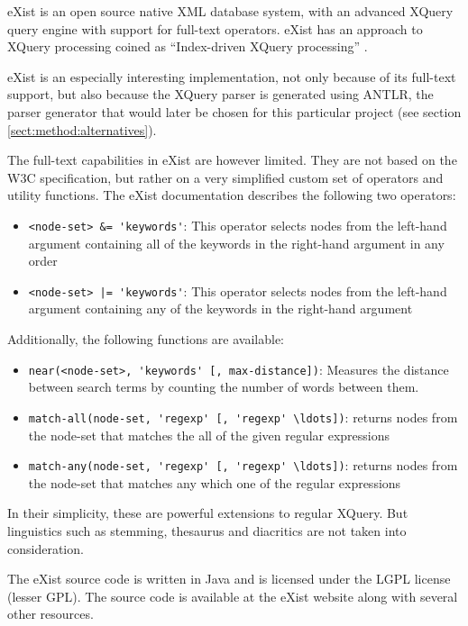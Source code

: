 eXist is an open source native XML database system, with an advanced XQuery
query engine with support for full-text operators. eXist has an approach to
XQuery processing coined as ``Index-driven XQuery processing''
\cite{exist_idx_drv_query}.

eXist is an especially interesting implementation, not only because of its
full-text support, but also because the XQuery parser is generated using
ANTLR, the parser generator that would later be chosen for this particular
project (see section \ref{sect:method:alternatives}).

The full-text capabilities in eXist are however limited. They are not based on
the W3C specification, but rather on a very simplified custom set of operators
and utility functions. The eXist documentation\cite{exist_doc} describes the
following two operators:

\begin{itemize}
  \item \verb!<node-set> &= 'keywords'!: This operator selects nodes from the
  left-hand argument containing all of the keywords in the right-hand argument 
  in any order
  \item \verb!<node-set> |= 'keywords'!: This operator selects nodes from the
  left-hand argument containing any of the keywords in the right-hand argument
\end{itemize}

Additionally, the following functions are available:
\begin{itemize}
  \item \verb!near(<node-set>, 'keywords' [, max-distance])!: Measures the 
  distance between search terms by counting the number of words between 
  them.
  \item \verb!match-all(node-set, 'regexp' [, 'regexp' \ldots])!: returns
  nodes from the node-set that matches the all of the given regular expressions 
  \item \verb!match-any(node-set, 'regexp' [, 'regexp' \ldots])!: returns nodes
  from the node-set that matches any which one of the regular expressions
\end{itemize}

In their simplicity, these are powerful extensions to regular XQuery. But
linguistics such as stemming, thesaurus and diacritics are not taken into
consideration.

The eXist source code is written in Java and is licensed under the LGPL license
(lesser GPL). The source code is available at the eXist website\cite{existweb}
along with several other resources. 

